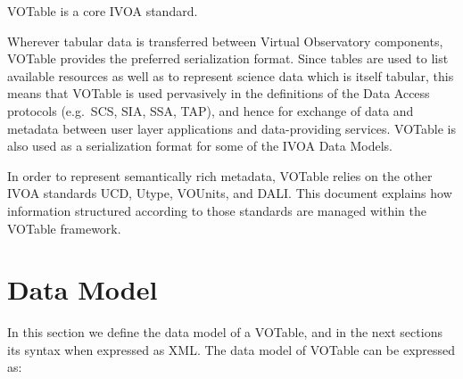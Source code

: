 VOTable is a core IVOA standard.

Wherever tabular data is transferred between Virtual Observatory components,
VOTable provides the preferred serialization format.
Since tables are used to list available resources as well as to
represent science data which is itself tabular,
this means that VOTable is used pervasively in the definitions
of the Data Access protocols (e.g.\ SCS, SIA, SSA, TAP),
and hence for exchange of data and metadata
between user layer applications and data-providing services.
VOTable is also used as a serialization format for
some of the IVOA Data Models.

In order to represent semantically rich metadata, VOTable relies on
the other IVOA standards UCD, Utype, VOUnits, and DALI.
This document explains how information structured according to those
standards are managed within the VOTable framework.


\section{Data Model}

In this section we define the data model of a VOTable, and in the
next sections its syntax when expressed as XML. The data model of
VOTable can be expressed as:    

